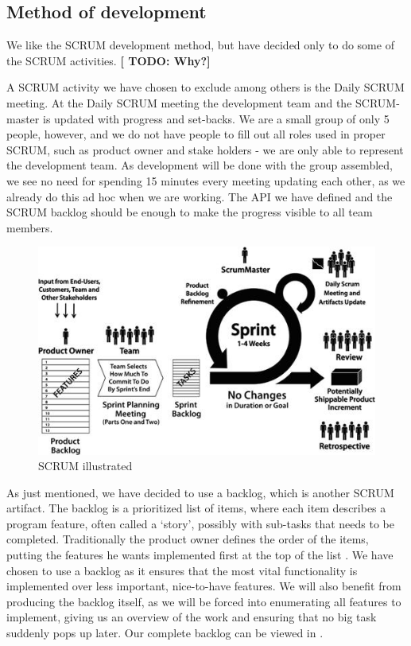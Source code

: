 \subsection{Method of development}
We like the SCRUM development method, but have decided only to do some of the SCRUM activities. \textbf{[ TODO: Why?]}

A SCRUM activity we have chosen to exclude among others is the Daily SCRUM meeting.
At the Daily SCRUM meeting the development team and the SCRUM-master is updated with progress and set-backs.
We are a small group of only 5 people, however, and we do not have people to fill out all roles used in proper SCRUM, such as product owner and stake holders - we are only able to represent the development team.
As development will be done with the group assembled, we see no need for spending 15 minutes every meeting updating each other, as we already do this ad hoc when we are working.
The API we have defined and the SCRUM backlog should be enough to make the progress visible to all team members.

\begin{figure}[t]
  \includegraphics[width=\textwidth]{illustrations/scrum.jpg}
  \caption{SCRUM illustrated}
  \label{scrum_picture}
\end{figure}

As just mentioned, we have decided to use a backlog, which is another SCRUM artifact.
The backlog is a prioritized list of items, where each item describes a program feature, often called a `story', possibly with sub-tasks that needs to be completed. Traditionally the product owner defines the order of the items, putting the features he wants implemented first at the top of the list \cite[p. 12]{scrum-org-guide}.
We have chosen to use a backlog as it ensures that the most vital functionality is implemented over less important, nice-to-have features. We will also benefit from producing the backlog itself, as we will be forced into enumerating all features to implement, giving us an overview of the work and ensuring that no big task suddenly pops up later.
Our complete backlog can be viewed in .

